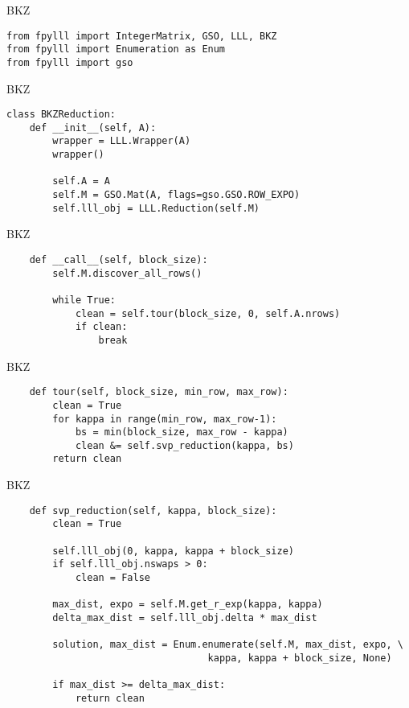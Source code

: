 \documentclass[presentation,smaller]{beamer}
\begin{document}
\begin{frame}[fragile,label={sec:orgheadline16}]{BKZ}
 \lstset{language=Python,label= ,caption= ,captionpos=b,numbers=none}
\begin{lstlisting}
from fpylll import IntegerMatrix, GSO, LLL, BKZ
from fpylll import Enumeration as Enum
from fpylll import gso
\end{lstlisting}
\end{frame}

\begin{frame}[fragile,label={sec:orgheadline17}]{BKZ}
 \lstset{language=Python,label= ,caption= ,captionpos=b,numbers=none}
\begin{lstlisting}
class BKZReduction:
    def __init__(self, A):
        wrapper = LLL.Wrapper(A)
        wrapper()

        self.A = A
        self.M = GSO.Mat(A, flags=gso.GSO.ROW_EXPO)
        self.lll_obj = LLL.Reduction(self.M)
\end{lstlisting}
\end{frame}

\begin{frame}[fragile,label={sec:orgheadline18}]{BKZ}
 \lstset{language=Python,label= ,caption= ,captionpos=b,numbers=none}
\begin{lstlisting}
    def __call__(self, block_size):
        self.M.discover_all_rows()

        while True:
            clean = self.tour(block_size, 0, self.A.nrows)
            if clean:
                break
\end{lstlisting}
\end{frame}

\begin{frame}[fragile,label={sec:orgheadline19}]{BKZ}
 \lstset{language=Python,label= ,caption= ,captionpos=b,numbers=none}
\begin{lstlisting}
    def tour(self, block_size, min_row, max_row):
        clean = True
        for kappa in range(min_row, max_row-1):
            bs = min(block_size, max_row - kappa)
            clean &= self.svp_reduction(kappa, bs)
        return clean
\end{lstlisting}
\end{frame}

\begin{frame}[fragile,label={sec:orgheadline20}]{BKZ}
 \lstset{language=Python,label= ,caption= ,captionpos=b,numbers=none}
\begin{lstlisting}
    def svp_reduction(self, kappa, block_size):
        clean = True

        self.lll_obj(0, kappa, kappa + block_size)
        if self.lll_obj.nswaps > 0:
            clean = False

        max_dist, expo = self.M.get_r_exp(kappa, kappa)
        delta_max_dist = self.lll_obj.delta * max_dist

        solution, max_dist = Enum.enumerate(self.M, max_dist, expo, \
                                   kappa, kappa + block_size, None)

        if max_dist >= delta_max_dist:
            return clean
\end{lstlisting}
\end{frame}
\end{document}
